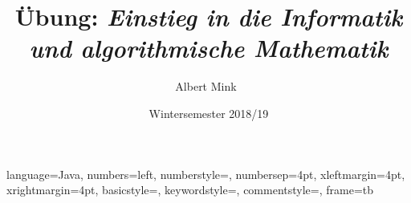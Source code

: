 {
  language=Java,
  numbers=left,
  numberstyle=\color{KITblack50}\ttfamily,
  numbersep=4pt, %
  xleftmargin=4pt, %
  xrightmargin=4pt, %
  basicstyle=\small\ttfamily, %
  keywordstyle=\color{KITgreen},  %
  commentstyle=\color{KITblue}\ttfamily, %
  frame=tb  %
}




\title[Institut f\"ur Angewandte und Numerische Mathematik]%
 {\fontsize{15}{15}\selectfont{}
  \"Ubung:
  \textit{Einstieg in die Informatik}\\[1.5mm]
  \textit{\phantom{\"Ubung:}\; und algorithmische Mathematik}\\[1.5mm]
  }%
\author{\fontsize{9}{9}\selectfont{}
 Albert Mink\
  }
\date{Wintersemester 2018/19}%
\subject{}%

